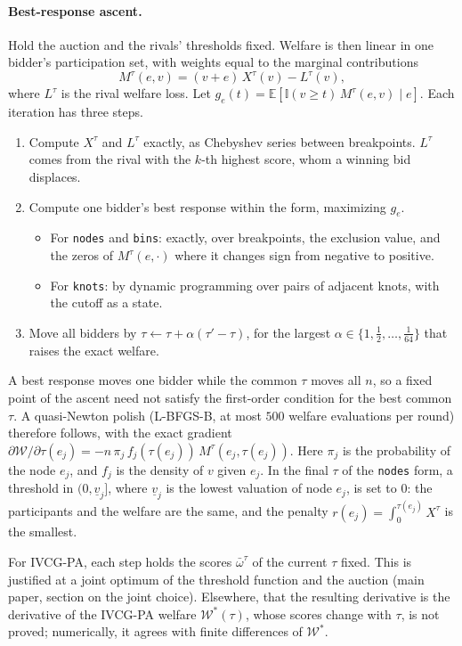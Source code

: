 \documentclass[11pt]{article}
\newcommand{\W}{\mathcal{W}}
\newcommand{\code}[1]{\texttt{#1}}
\begin{document}
\paragraph{Best-response ascent.} Hold the auction and the rivals' thresholds fixed. Welfare is then linear in one bidder's participation set, with weights equal to the marginal contributions
\[
M^\tau(e,v)=(v+e)\,X^\tau(v)-L^\tau(v),
\]
where $L^\tau$ is the rival welfare loss. Let $g_e(t)=\mathbb{E}[\mathbb{I}(v\geq t)\,M^\tau(e,v)\mid e]$. Each iteration has three steps.
\begin{enumerate}
    \item Compute $X^\tau$ and $L^\tau$ exactly, as Chebyshev series between breakpoints. $L^\tau$ comes from the rival with the $k$-th highest score, whom a winning bid displaces.
    \item Compute one bidder's best response within the form, maximizing $g_e$.
    \begin{itemize}
        \item For \code{nodes} and \code{bins}: exactly, over breakpoints, the exclusion value, and the zeros of $M^\tau(e,\cdot)$ where it changes sign from negative to positive.
        \item For \code{knots}: by dynamic programming over pairs of adjacent knots, with the cutoff as a state.
    \end{itemize}
    \item Move all bidders by $\tau\leftarrow\tau+\alpha(\tau'-\tau)$, for the largest $\alpha\in\{1,\tfrac12,\dots,\tfrac1{64}\}$ that raises the exact welfare.
\end{enumerate}
A best response moves one bidder while the common $\tau$ moves all $n$, so a fixed point of the ascent need not satisfy the first-order condition for the best common $\tau$. A quasi-Newton polish (L-BFGS-B, at most $500$ welfare evaluations per round) therefore follows, with the exact gradient $\partial\W/\partial\tau(e_j)=-n\,\pi_j\,f_j(\tau(e_j))\,M^\tau(e_j,\tau(e_j))$. Here $\pi_j$ is the probability of the node $e_j$, and $f_j$ is the density of $v$ given $e_j$. In the final $\tau$ of the \code{nodes} form, a threshold in $(0,\underline v_j]$, where $\underline v_j$ is the lowest valuation of node $e_j$, is set to $0$: the participants and the welfare are the same, and the penalty $r(e_j)=\int_0^{\tau(e_j)}X^\tau$ is the smallest.

For IVCG-PA, each step holds the scores $\bar\omega^\tau$ of the current $\tau$ fixed. This is justified at a joint optimum of the threshold function and the auction (main paper, section on the joint choice). Elsewhere, that the resulting derivative is the derivative of the IVCG-PA welfare $\W^*(\tau)$, whose scores change with $\tau$, is not proved; numerically, it agrees with finite differences of $\W^*$.
\end{document}
